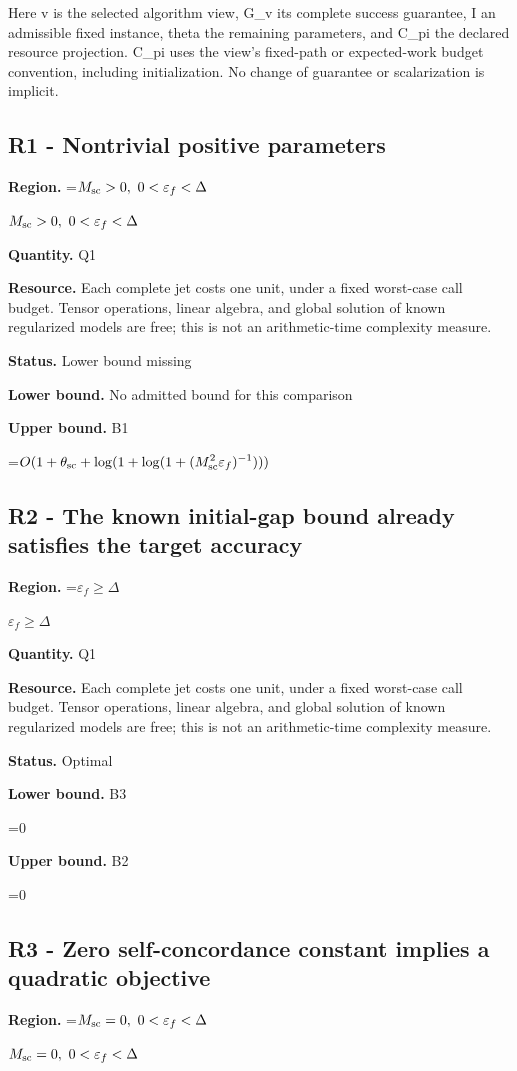 \documentclass[10pt,a4paper]{article}
\newcommand{\AtlasMath}[1]{\par\begingroup\centering\setbox0=\hbox{$\displaystyle #1$}\ifdim\wd0>1.4\linewidth\typeout{ATLAS WIDE FORMULA: \the\wd0}\fi\ifdim\wd0>\linewidth\resizebox{\linewidth}{!}{\box0}\else\box0\fi\par\endgroup}
\newcommand{\AtlasInlineMath}[1]{\begingroup\setbox0=\hbox{$#1$}\ifdim\wd0>.4\linewidth\endgroup\AtlasMath{#1}\else\endgroup$#1$\fi}
\begin{document}
Here v is the selected algorithm view, G\_v its complete success guarantee, I an admissible fixed instance, theta the remaining parameters, and C\_pi the declared resource projection. C\_pi uses the view's fixed-path or expected-work budget convention, including initialization. No change of guarantee or scalarization is implicit.

\subsection{R1 - Nontrivial positive parameters}
\textbf{Region.} \AtlasInlineMath{M_{\rm sc}>0,\ 0<\varepsilon_f<\Delta}

\textbf{Quantity.} Q1

\textbf{Resource.} Each complete jet costs one unit, under a fixed worst-case call budget. Tensor operations, linear algebra, and global solution of known regularized models are free; this is not an arithmetic-time complexity measure.

\textbf{Status.} Lower bound missing

\textbf{Lower bound.} No admitted bound for this comparison

\textbf{Upper bound.} B1

\AtlasMath{O(1+\theta_{\rm sc}+\log(1+\log(1+(M_{\rm sc}^2\varepsilon_f)^{-1})))}
\subsection{R2 - The known initial-gap bound already satisfies the target accuracy}
\textbf{Region.} \AtlasInlineMath{\varepsilon_f\ge\Delta}

\textbf{Quantity.} Q1

\textbf{Resource.} Each complete jet costs one unit, under a fixed worst-case call budget. Tensor operations, linear algebra, and global solution of known regularized models are free; this is not an arithmetic-time complexity measure.

\textbf{Status.} Optimal

\textbf{Lower bound.} B3

\AtlasMath{0}
\textbf{Upper bound.} B2

\AtlasMath{0}
\subsection{R3 - Zero self-concordance constant implies a quadratic objective}
\textbf{Region.} \AtlasInlineMath{M_{\rm sc}=0,\ 0<\varepsilon_f<\Delta}
\end{document}
